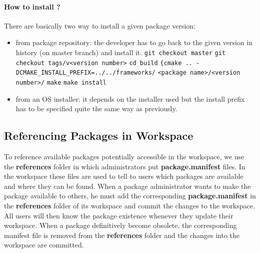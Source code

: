 \documentclass[12pt,a4paper]{article}
\begin{document}
\paragraph*{How to install ?}
There are basically two way to install a given package version:
\begin{itemize}
\item from package repository: the developer has to go back to the given version in history (on master branch) and install it.
\linebreak \texttt{git checkout master}
\linebreak \texttt{git checkout tags/v<version number>}
\linebreak \texttt{cd build}
\linebreak \verb|{cmake .. - DCMAKE_INSTALL_PREFIX=../../frameworks/|
\linebreak \verb|<package name>/<version number>/|
\linebreak \texttt{make}
\linebreak \texttt{make install}
\item from an OS installer: it depends on the installer used but the install prefix has to be specified quite the same way as previously.
\end{itemize}

\subsection{Referencing Packages in Workspace}

To reference available packages potentially accessible in the workspace, we use the \textbf{references} folder in which administrators put \textbf{package.manifest} files. In the workspace these files are used to tell to users which packages are available and where they can be found. When a package administrator wants to make the package available to others, he must add the corresponding \textbf{package.manifest} in the \textbf{references} folder of its workspace and commit the changes to the workspace. All users will then know the package existence whenever they update their workspace. When a package definitively become obsolete, the corresponding manifest file is removed from the \textbf{references} folder and the changes into the workspace are committed.
\end{document}
